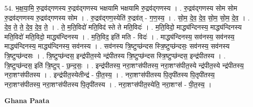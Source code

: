 \documentclass[17pt]{extarticle}
\begin{document}
54. भ॒क्ष॒या॒मि॒ रु॒द्रव॑द्‍गणस्य रु॒द्रव॑द्‍गणस्य भक्षयामि भक्षयामि रु॒द्रव॑द्‍गणस्य । . रु॒द्रव॑द्‍गणस्य सोम सोम रु॒द्रव॑द्‍गणस्य रु॒द्रव॑द्‍गणस्य सोम । . रु॒द्रव॑द्‍गण॒स्येति॑ रु॒द्रव॑त् - ग॒ण॒स्य॒ । . सो॒म॒ दे॒व॒ दे॒व॒ सो॒म॒ सो॒म॒ दे॒व॒ । . दे॒व॒ ते॒ ते॒ दे॒व॒ दे॒व॒ ते॒ । . ते॒ म॒ति॒विदो॑ मति॒विद॑ स्ते ते मति॒विदः॑ । . म॒ति॒विदो॒ माद्ध्य॑न्दिनस्य॒ माद्ध्य॑न्दिनस्य मति॒विदो॑ मति॒विदो॒ माद्ध्य॑न्दिनस्य । . म॒ति॒विद॒ इति॑ मति - विदः॑ । . माद्ध्य॑न्दिनस्य॒ सव॑नस्य॒ सव॑नस्य॒ माद्ध्य॑न्दिनस्य॒ माद्ध्य॑न्दिनस्य॒ सव॑नस्य । . सव॑नस्य त्रि॒ष्टुप्छ॑न्दस स्त्रि॒ष्टुप्छ॑न्दसः॒ सव॑नस्य॒ सव॑नस्य त्रि॒ष्टुप्छ॑न्दसः । . त्रि॒ष्टुप्छ॑न्दस॒ इन्द्र॑पीत॒स्ये न्द्र॑पीतस्य त्रि॒ष्टुप्छ॑न्दस स्त्रि॒ष्टुप्छ॑न्दस॒ इन्द्र॑पीतस्य । . त्रि॒ष्टुप्छ॑न्दस॒ इति॑ त्रि॒ष्टुप् - छ॒न्द॒सः॒ । . इन्द्र॑पीतस्य॒ नरा॒शꣳस॑पीतस्य॒ नरा॒शꣳस॑पीत॒स्ये न्द्र॑पीत॒स्ये न्द्र॑पीतस्य॒ नरा॒शꣳस॑पीतस्य । . इन्द्र॑पीत॒स्येतीन्द्र॑ - पी॒त॒स्य॒ । . नरा॒शꣳस॑पीतस्य पि॒तृपी॑तस्य पि॒तृपी॑तस्य॒ नरा॒शꣳस॑पीतस्य॒ नरा॒शꣳस॑पीतस्य पि॒तृपी॑तस्य । . नरा॒शꣳस॑पीत॒स्येति॒ नरा॒शꣳस॑ - पी॒त॒स्य॒ । \newline

\textbf{Ghana Paata } \newline
\end{document}

